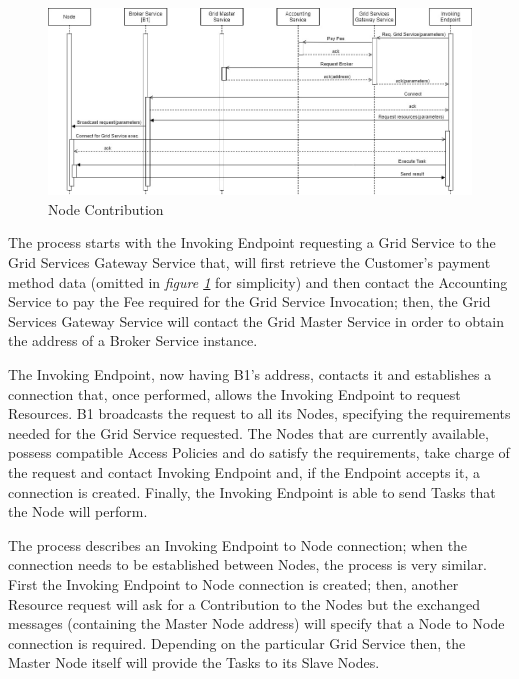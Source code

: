 \begin{itemize}
    \begin{figure}[!ht]
        \centering
        \includegraphics[width=\linewidth]{document/chapters/chapter_5/images/use_cases_satisfaction_node_contribution.jpg}
        \caption{Node Contribution}
        \label{fig:use_cases_satisfaction_node_contribution}
    \end{figure}

    The process starts with the Invoking Endpoint requesting a Grid Service to the Grid Services Gateway Service that, will first retrieve the Customer's payment method data (omitted in \textit{figure \ref{fig:use_cases_satisfaction_node_contribution}} for simplicity) and then contact the Accounting Service to pay the Fee required for the Grid Service Invocation; then, the Grid Services Gateway Service will contact the Grid Master Service in order to obtain the address of a Broker Service instance.

    The Invoking Endpoint, now having B1's address, contacts it and establishes a connection that, once performed, allows the Invoking Endpoint to request Resources. B1 broadcasts the request to all its Nodes, specifying the requirements needed for the Grid Service requested. The Nodes that are currently available, possess compatible Access Policies and do satisfy the requirements, take charge of the request and contact Invoking Endpoint and, if the Endpoint accepts it, a connection is created. Finally, the Invoking Endpoint is able to send Tasks that the Node will perform.

    The process describes an Invoking Endpoint to Node connection; when the connection needs to be established between Nodes, the process is very similar. First the Invoking Endpoint to Node connection is created; then, another Resource request will ask for a Contribution to the Nodes but the exchanged messages (containing the Master Node address) will specify that a Node to Node connection is required. Depending on the particular Grid Service then, the Master Node itself will provide the Tasks to its Slave Nodes.


\end{itemize}
